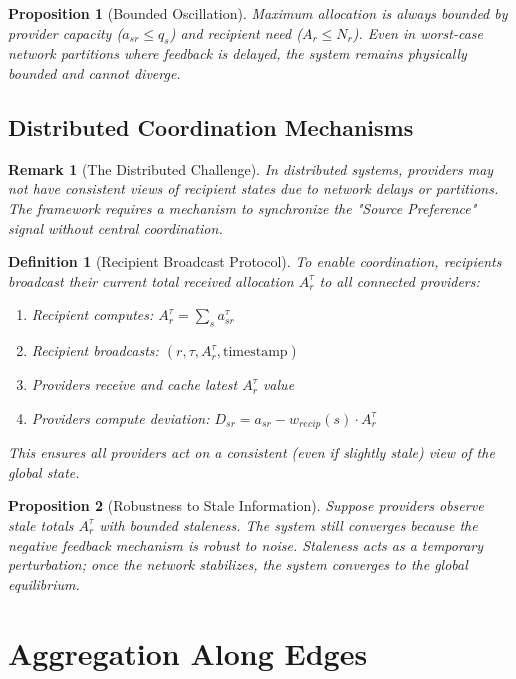 \documentclass[11pt]{article}
\newtheorem{definition}{Definition}
\newtheorem{proposition}{Proposition}
\newtheorem{remark}{Remark}
\begin{document}
\begin{proposition}[Bounded Oscillation]
Maximum allocation is always bounded by provider capacity ($a_{sr} \le q_s$) and recipient need ($A_r \le N_r$). Even in worst-case network partitions where feedback is delayed, the system remains physically bounded and cannot diverge.
\end{proposition}

\subsection{Distributed Coordination Mechanisms}

\begin{remark}[The Distributed Challenge]
In distributed systems, providers may not have consistent views of recipient states due to network delays or partitions. The framework requires a mechanism to synchronize the "Source Preference" signal without central coordination.
\end{remark}

\begin{definition}[Recipient Broadcast Protocol]
To enable coordination, recipients broadcast their current total received allocation $A_r^\tau$ to all connected providers:
\begin{enumerate}
\item Recipient computes: $A_r^\tau = \sum_s a_{sr}^\tau$
\item Recipient broadcasts: $(r, \tau, A_r^\tau, \text{timestamp})$
\item Providers receive and cache latest $A_r^\tau$ value
\item Providers compute deviation: $D_{sr} = a_{sr} - w_{recip}(s) \cdot A_r^\tau$
\end{enumerate}

This ensures all providers act on a consistent (even if slightly stale) view of the global state.
\end{definition}

\begin{proposition}[Robustness to Stale Information]
\label{prop:stale-robustness}
Suppose providers observe stale totals $A_r^\tau$ with bounded staleness. The system still converges because the negative feedback mechanism is robust to noise. Staleness acts as a temporary perturbation; once the network stabilizes, the system converges to the global equilibrium.
\end{proposition}

\section{Aggregation Along Edges}
\end{document}
